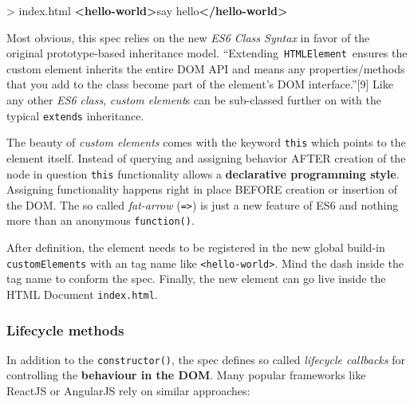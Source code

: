 \documentclass[]{assets/latex/ieee}
\newenvironment{Shaded}{}{}
\newcommand{\KeywordTok}[1]{\textcolor[rgb]{0.00,0.44,0.13}{\textbf{{#1}}}}
\newcommand{\NormalTok}[1]{{#1}}
\begin{document}
\begin{Shaded}
\begin{Highlighting}[]
\NormalTok{> index.html}
\KeywordTok{<hello-world>}\NormalTok{say hello}\KeywordTok{</hello-world>}
\end{Highlighting}
\end{Shaded}

Most obvious, this spec relies on the new \emph{ES6 Class Syntax} in
favor of the original prototype-based inheritance model.
``Extending~\texttt{HTMLElement}~ensures the custom element inherits the
entire DOM API and means any properties/methods that you add to the
class become part of the element's DOM interface.''{[}9{]} Like any
other \emph{ES6 class}, \emph{custom element}s can be sub-classed
further on with the typical \texttt{extends} inheritance.

The beauty of \emph{custom elements} comes with the keyword
\texttt{this} which points to the element itself. Instead of querying
and assigning behavior AFTER creation of the node in question
\texttt{this} functionality allows a \textbf{declarative programming
style}. Assigning functionality happens right in place BEFORE creation
or insertion of the DOM. The so called \emph{fat-arrow}
(\texttt{=\textgreater{}}) is just a new feature of ES6 and nothing more
than an anonymous \texttt{function()}.

After definition, the element needs to be registered in the new global
build-in \texttt{customElements} with an tag name like
\texttt{\textless{}hello-world\textgreater{}}. Mind the dash inside the
tag name to conform the spec. Finally, the new element can go live
inside the HTML Document \texttt{index.html}.

\subsubsection{Lifecycle methods}\label{lifecycle-methods}

In addition to the \texttt{constructor()}, the spec defines so called
\emph{lifecycle callbacks} for controlling the \textbf{behaviour in the
DOM}. Many popular frameworks like ReactJS or AngularJS rely on similar
approaches:
\end{document}
